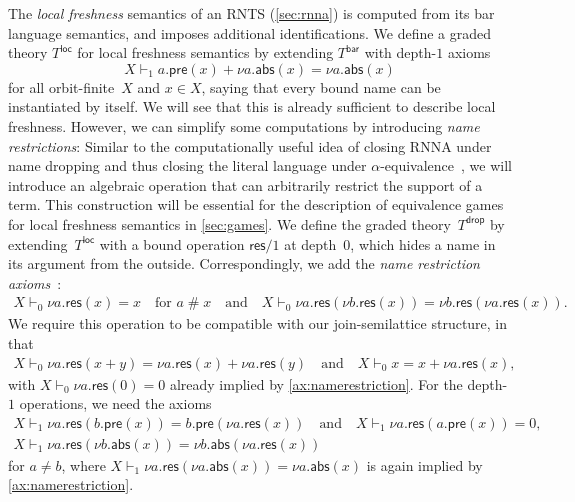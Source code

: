\documentclass[a4paper,UKenglish,cleveref,thm-restate,numberwithinsect,final]{lipics-v2021}
\newcommand{\Br}{\mathsf{bar}}
\newcommand{\pre}{\mathsf{pre}}
\newcommand{\abs}{\mathsf{abs}}
\newcommand{\res}{\mathsf{res}}
\newcommand{\loc}{\mathsf{loc}}
\newcommand{\drop}{\mathsf{drop}}
\newcommand{\fresh}{\mathbin{\#}}
\theoremstyle{plain}
\numberwithin{equation}{section}
\newcommand{\+}[1]{\mathcal{#1}\xspace}
\theoremstyle{definition}
\begin{document}
The \emph{local freshness} semantics of an RNTS (\cref{sec:rnna}) is
computed from its bar language semantics, and imposes additional
identifications. We define a graded theory $T^\loc$ for local
freshness semantics by extending $T^\Br$ with depth-$1$ axioms
\begin{equation}\label{ax:loc}
  X\vdash_1 a.\pre(x)+\nu a.\abs(x)=\nu a.\abs(x)
\end{equation}
for all orbit-finite~$X$ and $x\in X$, saying that every bound name
can be instantiated by itself. %
We will see that this is already sufficient to describe local
freshness.  However, we can simplify some computations by introducing
\emph{name restrictions}: Similar to the computationally useful idea
of closing RNNA under name dropping and thus closing the literal
language under $\alpha$-equivalence~\cite{SchroderEA17}, we will
introduce an algebraic operation that can arbitrarily restrict the
support of a term.  This construction will be essential for the
description of equivalence games for local freshness semantics in
\cref{sec:games}. We define the graded theory~$T^\drop$ by
extending~$T^\loc$ with a bound operation $\res/1$ at depth~$0$, which
hides a name in its argument from the outside.  Correspondingly, we
add the \emph{name restriction
  axioms}~\cite[Chapter~9]{Pitts13}: %
\begin{gather}
  X \vdash_0 \nu a.\res(x) = x \quad \text{for } a\fresh x
  \quad\text{and}\quad
  X \vdash_0 \nu a.\res(\nu b.\res(x)) = \nu b.\res(\nu a.\res(x)). \label{ax:namerestriction}
\end{gather}
We require this operation to be compatible with our join-semilattice
structure, in that
\begin{gather}
  X \vdash_0 \nu a.\res(x + y) = \nu a.\res(x) + \nu a.\res(y)
  \quad\text{and}\quad
  X \vdash_0 x = x + \nu a.\res(x), \label{ax:namerestrictionsemilattice}
\end{gather}
with $X \vdash_0 \nu a.\res(0) = 0$ already implied by \eqref{ax:namerestriction}.
For the depth-$1$ operations, we need the axioms
\begin{gather}
  X \vdash_1 \nu a.\res(b.\pre(x)) = b.\pre(\nu a.\res(x)) \quad\text{and}\quad X \vdash_1 \nu a.\res(a.\pre(x)) = 0, \label{ax:respre} \\
  X \vdash_1 \nu a.\res(\nu b.\abs(x)) = \nu b.\abs(\nu a.\res(x)) \label{ax:resabs}
\end{gather}
for $a \neq b$, where $X \vdash_1 \nu a.\res(\nu a.\abs(x)) = \nu a.\abs(x)$ is again implied by \eqref{ax:namerestriction}.
\end{document}
